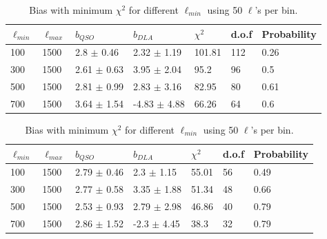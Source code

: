 \documentclass{amsart}
\begin{document}
\begin{center}
\begin{table}[htbp]

\caption{Bias with minimum $\chi^2$  for different $\ell_{min}$ using 25 $\ell$'s per bin.}
\begin{tabular}{p{}p{}p{}p{}p{}p{}p{}} \\ \toprule
$\ell_{min}$ & $\ell_{max}$ & \multicolumn{1}{p{0cm}}{$b_{QSO}$} & $b_{DLA}$ & \multicolumn{1}{p{2cm}}{$\chi^2$} & d.o.f  & Probability\\ \midrule
100  &  1500  &  2.8  $\pm$  0.46  &  2.32  $\pm$  1.19  &  101.81  &  112  &  0.26 \\
300  &  1500  &  2.61  $\pm$  0.63  &  3.95  $\pm$  2.04  &  95.2  &  96  &  0.5 \\
500  &  1500  &  2.81  $\pm$  0.99  &  2.83  $\pm$  3.16  &  82.95  &  80  &  0.61 \\
700  &  1500  &  3.64  $\pm$  1.54  &  -4.83  $\pm$  4.88  &  66.26  &  64  &  0.6 \\
 \bottomrule
\end{tabular}
\vspace{2cm}

\caption{Bias with minimum $\chi^2$  for different $\ell_{min}$ using 50 $\ell$'s per bin.}
\begin{tabular}{p{}p{}p{}p{}p{}p{}p{}} \\ \toprule
$\ell_{min}$ & $\ell_{max}$ & \multicolumn{1}{p{0cm}}{$b_{QSO}$} & $b_{DLA}$ & \multicolumn{1}{p{2cm}}{$\chi^2$} & d.o.f  & Probability\\ \midrule
100  &  1500  &  2.79  $\pm$  0.46  &  2.3  $\pm$  1.15  &  55.01  &  56  &  0.49 \\
300  &  1500  &  2.77  $\pm$  0.58  &  3.35  $\pm$  1.88  &  51.34  &  48  &  0.66 \\
500  &  1500  &  2.53  $\pm$  0.93  &  2.79  $\pm$  2.98  &  46.86  &  40  &  0.79 \\
700  &  1500  &  2.86  $\pm$  1.52  &  -2.3  $\pm$  4.45  &  38.3  &  32  &  0.79 \\
 \bottomrule
\end{tabular}
\vspace{2cm}


\end{table}
\end{center}
\end{document}
